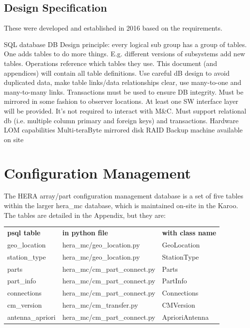\documentclass{article}
\newcommand{\mc}{M\&C}
\begin{document}
\subsection{Design Specification}
These were developed and established in 2016 based on the requirements.

\begin{outline}[enumerate]
	\1 SQL database
		\2 DB Design principle: every logical sub group has a group of tables.  One adds tables to do more things. E.g. different versions of subsystems add new tables. Operations reference which tables they use.
		\2 This document (and appendices) will contain all table definitions.
		\2 Use careful dB design to avoid duplicated data, make table links/data relationships clear, use many-to-one and many-to-many links.
		\2 Transactions must be used to ensure DB integrity.
		\2 Must be mirrored in some fashion to observer locations.
	\1 At least one SW interface layer will be provided.
		\2 It's not required to interact with \mc.
		\2 Must support relational db (i.e. multiple column primary and foreign keys) and transactions.
	\1 Hardware
		\2 LOM capabilities
		\2 Multi-teraByte mirrored disk RAID
		\2 Backup machine available on site
\end{outline}




\section{Configuration Management}
\label{sec:config}

The HERA array/part configuration management database is a set of five tables within the larger hera\_mc database, which is maintained on-site in the Karoo.  The tables are detailed in the Appendix,
but they are:

\begin{center}
\begin{tabular}{l l l}
         {\bf psql table} & {\bf in python file}  &  {\bf with class name} \\
	geo\_location 	& hera\_mc/geo\_location.py & GeoLocation \\
	station\_type 	& hera\_mc/geo\_location.py & StationType \\
	parts 	& hera\_mc/cm\_part\_connect.py & Parts \\
	part\_info 	         & hera\_mc/cm\_part\_connect.py & PartInfo \\
	connections 	& hera\_mc/cm\_part\_connect.py & Connections \\
	cm\_version      & hera\_mc/cm\_transfer.py & CMVersion\\
	antenna\_apriori & hera\_mc/cm\_part\_connect.py & AprioriAntenna\
\end{tabular}
\end{center}
\end{document}

